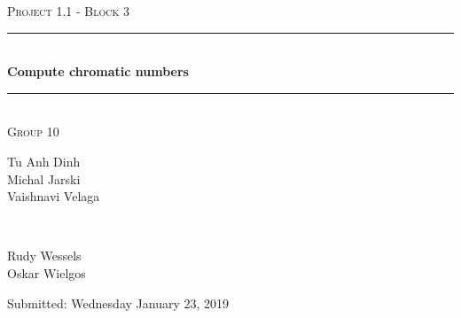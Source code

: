 \documentclass[a4paper]{report}
\begin{document}
	\begin{titlepage} 
		\newcommand{\HRule}{\rule{\linewidth}{0.5mm}}
		
		\center 
		
		\textsc{\large Project 1.1 - Block 3}\\[0.5cm] 
		
		\HRule\\[0.4cm]
		
		{\huge\bfseries Compute chromatic numbers}\\[0.4cm] 
		
		\HRule\\[1.5cm]
		
		\textsc{\large Group 10}\\[0.5cm]

		\begin{minipage}{0.6\textwidth}
			\begin{flushleft}
				Tu Anh Dinh\\Michal Jarski\\Vaishnavi Velaga
			\end{flushleft}
		\end{minipage}
		~
		\begin{minipage}{0.3\textwidth}
			\begin{flushleft}
				Rudy Wessels\\Oskar Wielgos\\
			\end{flushleft}
		\end{minipage}
		
		\vspace{2cm}
		
		Submitted: Wednesday January 23, 2019
		
		
	\end{titlepage}
	
	
	
	
	
\end{document}
